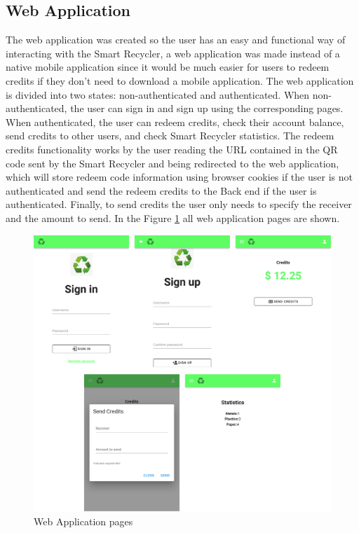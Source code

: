 \documentclass[a4paper,11pt]{article}
\begin{document}
\subsection{Web Application}
\label{subsec:webapp}
The web application was created so the user has an easy and functional way of interacting with the Smart Recycler, a web application was made instead of a native mobile application since it would be much easier for users to redeem credits if they don’t need to download a mobile application.
The web application is divided into two states: non-authenticated and authenticated. When non-authenticated, the user can sign in and sign up using the corresponding pages. When authenticated, the user can redeem credits, check their account balance, send credits to other users, and check Smart Recycler statistics. The redeem credits functionality works by the user reading the URL contained in the QR code sent by the Smart Recycler and being redirected to the web application, which will store redeem code information using browser cookies if the user is not authenticated and send the redeem credits to the Back end if the user is authenticated. Finally, to send credits the user only needs to specify the receiver and the amount to send.
In the Figure \ref{fig:front_pages} all web application pages are shown.

\begin{figure}[H]
  \centering
  \includegraphics[scale=0.1]{Figures/front_pages.png}
  \caption{\small{Web Application pages}}
  \label{fig:front_pages}
\end{figure}
\end{document}
